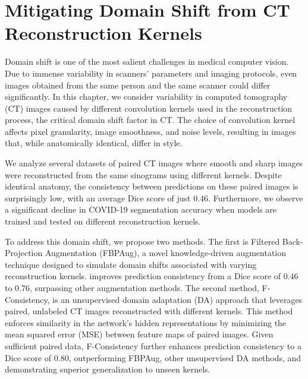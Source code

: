 

\chapter{Mitigating Domain Shift from CT Reconstruction Kernels}
\label{chap:ct}

Domain shift is one of the most salient challenges in medical computer vision. Due to immense variability in scanners’ parameters and imaging protocols, even images obtained from the same person and the same scanner could differ significantly. In this chapter, we consider variability in computed tomography (CT) images caused by different convolution kernels used in the reconstruction process, the critical domain shift factor in CT. The choice of convolution kernel affects pixel granularity, image smoothness, and noise levels, resulting in images that, while anatomically identical, differ in style.

We analyze several datasets of paired CT images where smooth and sharp images were reconstructed from the same sinograms using different kernels. Despite identical anatomy, the consistency between predictions on these paired images is surprisingly low, with an average Dice score of just $0.46$. Furthermore, we observe a significant decline in COVID-19 segmentation accuracy when models are trained and tested on different reconstruction kernels.

To address this domain shift, we propose two methods. The first is Filtered Back-Projection Augmentation (FBPAug), a novel knowledge-driven augmentation technique designed to simulate domain shifts associated with varying reconstruction kernels.  improves prediction consistency from a Dice score of $0.46$ to $0.76$, surpassing other augmentation methods. The second method, F-Consistency, is an unsupervised domain adaptation (DA) approach that leverages paired, unlabeled CT images reconstructed with different kernels. This method enforces similarity in the network’s hidden representations by minimizing the mean squared error (MSE) between feature maps of paired images. Given sufficient paired data, F-Consistency further enhances prediction consistency to a Dice score of $0.80$, outperforming FBPAug, other unsupervised DA methods, and demonstrating superior generalization to unseen kernels.


